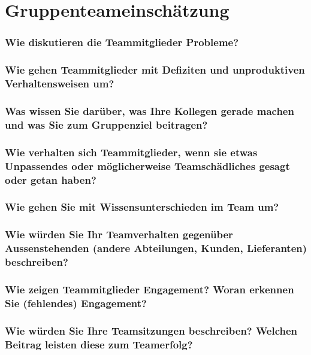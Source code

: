 \chapter{Gruppenteameinschätzung}\label{Gruppenteameinschätzung}

\subsection*{Wie diskutieren die Teammitglieder Probleme?}

\subsection*{Wie gehen Teammitglieder mit Defiziten und unproduktiven Verhaltensweisen um?}

\subsection*{Was wissen Sie darüber, was Ihre Kollegen gerade machen und was Sie zum
Gruppenziel beitragen?}

\subsection*{Wie verhalten sich Teammitglieder, wenn sie etwas Unpassendes oder möglicherweise Teamschädliches gesagt oder getan haben?}

\subsection*{Wie gehen Sie mit Wissensunterschieden im Team um?}

\subsection*{Wie würden Sie Ihr Teamverhalten gegenüber Aussenstehenden (andere Abteilungen,
Kunden, Lieferanten) beschreiben?}

\subsection*{Wie zeigen Teammitglieder Engagement? Woran erkennen Sie (fehlendes)
Engagement?}

\subsection*{Wie würden Sie Ihre Teamsitzungen beschreiben? Welchen Beitrag leisten diese zum
Teamerfolg?}

